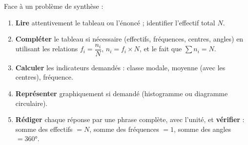 \documentclass[11pt]{article}
\begin{document}
\begin{methode}
Face à un problème de synthèse :
\begin{enumerate}
\item \textbf{Lire} attentivement le tableau ou l'énoncé ; identifier l'effectif total $N$.
\item \textbf{Compléter} le tableau si nécessaire (effectifs, fréquences, centres, angles) en utilisant les relations $f_i = \dfrac{n_i}{N}$, $n_i = f_i \times N$, et le fait que $\sum n_i = N$.
\item \textbf{Calculer} les indicateurs demandés : classe modale, moyenne (avec les centres), fréquence.
\item \textbf{Représenter} graphiquement si demandé (histogramme ou diagramme circulaire).
\item \textbf{Rédiger} chaque réponse par une phrase complète, avec l'unité, et \textbf{vérifier} : somme des effectifs $= N$, somme des fréquences $= 1$, somme des angles $= 360°$.
\end{enumerate}
\end{methode}
\end{document}
